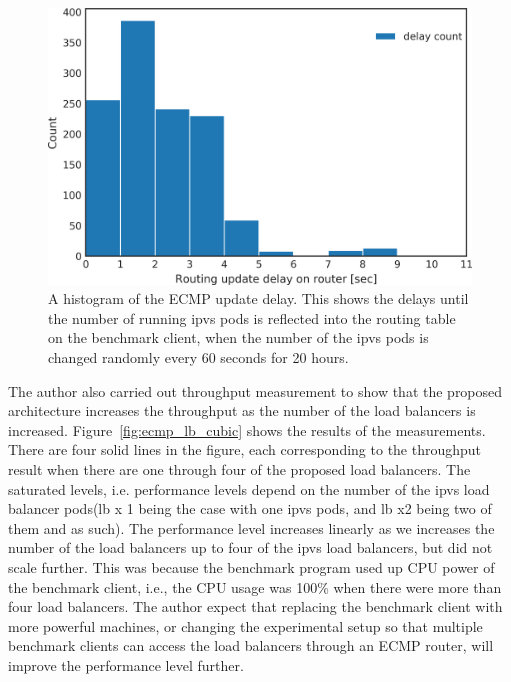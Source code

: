 \begin{figure}[h]
  \includegraphics[width=0.8\columnwidth,left]{Figs/ecmp_delay_histgram}
  \par\bigskip
  \centering
  \begin{minipage}{0.8\columnwidth}
    \caption[A histogram of the ECMP update delay]{
      A histogram of the ECMP update delay.
      This shows the delays until the number of running ipvs pods is reflected into the routing table on the benchmark client,
    when the number of the ipvs pods is changed randomly every 60 seconds for 20 hours.
    }
  \end{minipage}
  \label{fig:ecmp_delay_histgram}
\end{figure}

The author also carried out throughput measurement to show that the proposed architecture increases the throughput as the number of the load balancers is increased.
Figure~\ref{fig:ecmp_lb_cubic} shows the results of the measurements.
There are four solid lines in the figure, each corresponding to the throughput result when there are one through four of the proposed load balancers.
The saturated levels, i.e. performance levels depend on the number of the ipvs load balancer pods(lb x 1 being the case with one ipvs pods, and lb x2 being two of them and as such). The performance level increases linearly as we increases the number of the load balancers up to four of the ipvs load balancers, but did not scale further.
This was because the benchmark program used up CPU power of the benchmark client, i.e., the CPU usage was 100\% when there were more than four load balancers.
The author expect that replacing the benchmark client with more powerful machines, or changing the experimental setup so that multiple benchmark clients can access the load balancers through an ECMP router, will improve the performance level further.

